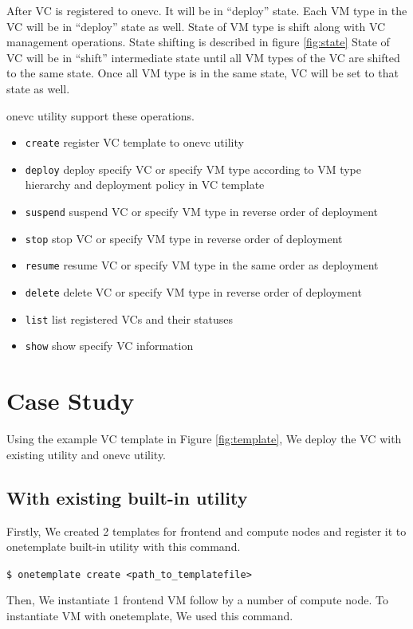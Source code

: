 \documentclass[conference]{IEEEtran}
\begin{document}
After VC is registered to onevc. It will be in ``deploy'' state.
Each VM type in the VC will be in ``deploy'' state as well.
State of VM type is shift along with VC management operations.
State shifting is described in figure \ref{fig:state}
State of VC will be in ``shift'' intermediate state until all VM types of the VC are shifted to the same state.
Once all VM type is in the same state, VC will be set to that state as well.

onevc utility support these operations.

\begin{itemize}
\item \texttt{create} register VC template to onevc utility
\item \texttt{deploy} deploy specify VC or specify VM type according to VM type hierarchy and deployment policy in VC template
\item \texttt{suspend} suspend VC or specify VM type in reverse order of deployment
\item \texttt{stop} stop VC or specify VM type in reverse order of deployment
\item \texttt{resume} resume VC or specify VM type in the same order as deployment
\item \texttt{delete} delete VC or specify VM type in reverse order of deployment
\item \texttt{list} list registered VCs and their statuses
\item \texttt{show} show specify VC information
\end{itemize}

\section{Case Study}
Using the example VC template in Figure \ref{fig:template}, We deploy the VC with existing utility and onevc utility.

\subsection{With existing built-in utility}
Firstly, We created 2 templates for frontend and compute nodes and register it to onetemplate built-in utility with this command.

\texttt{\$ onetemplate create <path\_to\_templatefile>}

Then, We instantiate 1 frontend VM follow by a number of compute node.
To instantiate VM with onetemplate, We used this command.
\end{document}
